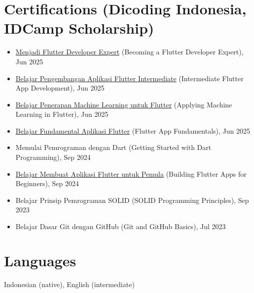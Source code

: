 \documentclass{resume}
\begin{document}


\section{Certifications (Dicoding Indonesia, IDCamp Scholarship)}
\begin{itemize}
\item \href{https://www.dicoding.com/certificates/ERZREQDOQXYV}{Menjadi Flutter Developer Expert} (Becoming a Flutter Developer Expert), Jun 2025
\item \href{https://www.dicoding.com/certificates/L4PQENK6OPO1}{Belajar Pengembangan Aplikasi Flutter Intermediate} (Intermediate Flutter App Development), Jun 2025
\item \href{https://www.dicoding.com/certificates/N9ZO9WWJ6XG5}{Belajar Penerapan Machine Learning untuk Flutter} (Applying Machine Learning in Flutter), Jun 2025
\item \href{https://www.dicoding.com/certificates/MRZMN0W2RPYQ}{Belajar Fundamental Aplikasi Flutter} (Flutter App Fundamentals), Jun 2025
\item Memulai Pemrograman dengan Dart (Getting Started with Dart Programming), Sep 2024
\item \href{https://www.dicoding.com/certificates/81P2N089YXOY}{Belajar Membuat Aplikasi Flutter untuk Pemula} (Building Flutter Apps for Beginners), Sep 2024
\item Belajar Prinsip Pemrograman SOLID (SOLID Programming Principles), Sep 2023
\item Belajar Dasar Git dengan GitHub (Git and GitHub Basics), Jul 2023
\end{itemize}


\section{Languages}
Indonesian (native), English (intermediate)
\end{document}
